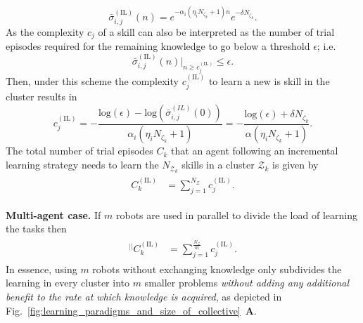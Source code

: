 \begin{equation*}\label{eq:remaining_knowledge__IL}
	\bar{\sigma}^{(\text{IL})}_{i,j}(n) = e^{-\alpha_i  \left(\eta_i N_{\zeta_k}+1\right) n} e^{-\delta N_{\zeta_k}}.
\end{equation*}
As the complexity $c_{j}$ of a skill can also be interpreted as the number of trial episodes required for the remaining knowledge to go below a threshold $\epsilon$; i.e.
\begin{equation*}
	\bar{\sigma}^{(\text{IL})}_{i,j}(n) \Big \rvert_{n \ge c^{(\text{IL})}_{j}} \leq \epsilon.
\end{equation*}
Then, under this scheme the complexity $c^{(\text{IL})}_{j}$ to learn a new is skill in the cluster results in
\begin{equation}\label{eq:complexity_IL}
	c^{(\text{IL})}_{j} = -\frac{\text{log}(\epsilon) - \text{log}\left(\bar{\sigma}^{(IL)}_{i,j}(0)\right)}{\alpha_i (\eta_i N_{\zeta_k}+ 1)} = -\frac{\text{log}(\epsilon) + \delta N_{\zeta_k}}{\alpha (\eta_i N_{\zeta_k}+ 1)}  .
\end{equation}
The total number of trial episodes $ C_k $ that an agent following an incremental learning strategy needs to learn the $N_{\mathcal{Z}_k}$ skills in a cluster $ \mathcal{Z}_k $ is given by
\begin{align}\label{eq:total_episodes_incremental}
	\begin{split}
		C^{(\text{IL})}_k &= \sum^{N_{\mathcal{Z}}}_{j=1} c^{(\text{IL})}_{j}.
	\end{split}
\end{align}

\textbf{Multi-agent case.} If $m$ robots are used in parallel to divide the load of learning the tasks then
\begin{align}
	\begin{split}
		{}^{\lvert \rvert}C^{(\text{IL})}_k &= \sum^{\frac{N_{\mathcal{Z}}}{m}}_{j=1} c^{(\text{IL})}_{j}.
	\end{split}
\end{align}
In essence, using $m$ robots without exchanging knowledge only subdivides the learning in every cluster into $m$ smaller problems \emph{without adding any additional benefit to the rate at which knowledge is acquired}, as depicted in Fig.~\ref{fig:learning_paradigms_and_size_of_collective}~\textbf{A}. 

